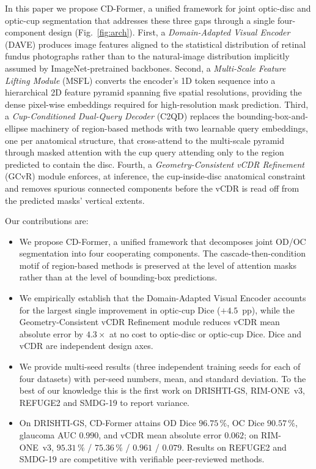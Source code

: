 \documentclass[runningheads]{llncs}
\begin{document}
In this paper we propose CD-Former, a unified framework for joint optic-disc and optic-cup segmentation that addresses these three gaps through a single four-component design (Fig.~\ref{fig:arch}). First, a \emph{Domain-Adapted Visual Encoder} (DAVE) produces image features aligned to the statistical distribution of retinal fundus photographs rather than to the natural-image distribution implicitly assumed by ImageNet-pretrained backbones. Second, a \emph{Multi-Scale Feature Lifting Module} (MSFL) converts the encoder's 1D token sequence into a hierarchical 2D feature pyramid spanning five spatial resolutions, providing the dense pixel-wise embeddings required for high-resolution mask prediction. Third, a \emph{Cup-Conditioned Dual-Query Decoder} (C2QD) replaces the bounding-box-and-ellipse machinery of region-based methods with two learnable query embeddings, one per anatomical structure, that cross-attend to the multi-scale pyramid through masked attention with the cup query attending only to the region predicted to contain the disc. Fourth, a \emph{Geometry-Consistent vCDR Refinement} (GCvR) module enforces, at inference, the cup-inside-disc anatomical constraint and removes spurious connected components before the vCDR is read off from the predicted masks' vertical extents.

Our contributions are:
\begin{itemize}
  \item We propose CD-Former, a unified framework that decomposes joint OD/OC segmentation into four cooperating components. The cascade-then-condition motif of region-based methods is preserved at the level of attention masks rather than at the level of bounding-box predictions.
  \item We empirically establish that the Domain-Adapted Visual Encoder accounts for the largest single improvement in optic-cup Dice ($+4.5$~pp), while the Geometry-Consistent vCDR Refinement module reduces vCDR mean absolute error by $4.3\times$ at no cost to optic-disc or optic-cup Dice. Dice and vCDR are independent design axes.
  \item We provide multi-seed results (three independent training seeds for each of four datasets) with per-seed numbers, mean, and standard deviation. To the best of our knowledge this is the first work on DRISHTI-GS, RIM-ONE~v3, REFUGE2 and SMDG-19 to report variance.
  \item On DRISHTI-GS, CD-Former attains OD Dice $96.75\,\%$, OC Dice $90.57\,\%$, glaucoma AUC $0.990$, and vCDR mean absolute error $0.062$; on RIM-ONE~v3, $95.31\,\%$ / $75.36\,\%$ / $0.961$ / $0.079$. Results on REFUGE2 and SMDG-19 are competitive with verifiable peer-reviewed methods.
\end{itemize}
\end{document}
